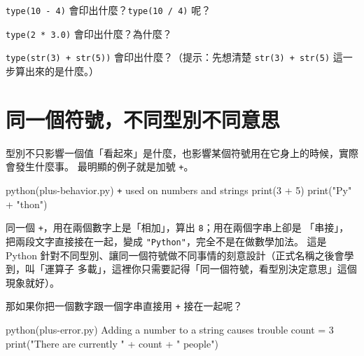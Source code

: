 

\begin{drills}[label=drills:type-more-uses]
\item \texttt{type(10 - 4)} 會印出什麼？\texttt{type(10 / 4)} 呢？
\item \texttt{type(2 * 3.0)} 會印出什麼？為什麼？
\item \texttt{type(str(3) + str(5))} 會印出什麼？（提示：先想清楚 \texttt{str(3) +
str(5)} 這一步算出來的是什麼。）
\end{drills}

\section{同一個符號，不同型別不同意思}
\label{sec:type-operators}

型別不只影響一個值「看起來」是什麼，也影響某個符號用在它身上的時候，實際會發生什麼事。
最明顯的例子就是加號 \texttt{+}。

\begin{example}{python}{(plus-behavior.py) \texttt{+} used on numbers and strings}
print(3 + 5)
print("Py" + "thon")
\end{example}


同一個 \texttt{+}，用在兩個數字上是「相加」，算出 \texttt{8}；用在兩個字串上卻是
「串接」，把兩段文字直接接在一起，變成 \texttt{"Python"}，完全不是在做數學加法。
這是
Python 針對不同型別、讓同一個符號做不同事情的刻意設計（正式名稱之後會學到，叫「運算子
多載」，這裡你只需要記得「同一個符號，看型別決定意思」這個現象就好）。

那如果你把一個數字跟一個字串直接用 \texttt{+} 接在一起呢？

\begin{example}{python}{(plus-error.py) Adding a number to a string causes trouble}
count = 3
print("There are currently " + count + " people")
\end{example}

